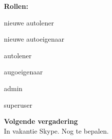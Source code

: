 \documentclass[11pt,a4paper,oneside]{article}
\renewenvironment{itemize}[1]{\begin{compactitem}#1}{\end{compactitem}}
\begin{document}
\begin{itemize}
\item \textbf{Rollen:\\}
\begin{itemize}
\item nieuwe autolener
\item nieuwe autoeigenaar
\item autolener
\item augoeigenaar
\item admin 
\item superuser
\end{itemize}

\par\item \textbf{Volgende vergadering} \\
In vakantie Skype.
Nog te bepalen.

\end{itemize}
\end{document}
